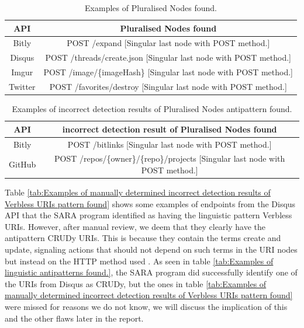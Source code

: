 \begin{table}[htb!]
    \centering
    \begin{tabular}{|c|c|} \hline
       API  & Pluralised Nodes found \\ \hline
       Bitly & POST  /expand [Singular last node with POST method.] \\ \hline
       Disqus & POST  /threads/create.json [Singular last node with POST method.] \\ \hline
       Imgur & POST  /image/\{imageHash\} [Singular last node with POST method.] \\ \hline
       Twitter & POST  /favorites/destroy [Singular last node with POST method.] \\ \hline
    \end{tabular}
    \caption{Examples of Pluralised Nodes found.}
    \label{tab:Examples of Pluralised Nodes found.}
\end{table}

\begin{table}[htb!]
    \centering
    \begin{tabular}{|c|c|} \hline
       API  & incorrect detection result of Pluralised Nodes found \\ \hline
       Bitly & POST  /bitlinks [Singular last node with POST method.] \\ \hline
       GitHub & POST  /repos/\{owner\}/\{repo\}/projects [Singular last node with POST method.] \\ \hline
    \end{tabular}
    \caption{Examples of incorrect detection results of Pluralised Nodes antipattern found.}
    \label{tab:Examples of manually determined incorrect detection results of Pluralised Nodes found.}
\end{table}

Table \ref{tab:Examples of manually determined incorrect detection results of Verbless URIs pattern found} shows some examples of endpoints from the Disqus API that the SARA program identified as having the linguistic pattern Verbless URIs. However, after manual review, we deem that they clearly have the antipattern CRUDy URIs. This is because they contain the terms create and update, signaling actions that should not depend on such terms in the URI nodes but instead on the HTTP method used \cite{linguistic}. As seen in table \ref{tab:Examples of linguistic antipatterns found.}, the SARA program did successfully identify one of the URIs from Disqus as CRUDy, but the ones in table \ref{tab:Examples of manually determined incorrect detection results of Verbless URIs pattern found} were missed for reasons we do not know, we will discuss the implication of this and the other flaws later in the report.

